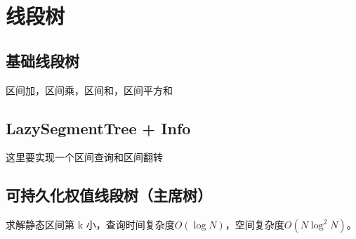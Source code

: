 \section{线段树}
\subsection{基础线段树}


区间加，区间乘，区间和，区间平方和


\subsection{LazySegmentTree + Info}
这里要实现一个区间查询和区间翻转


\subsection{可持久化权值线段树（主席树）}
求解静态区间第 k 小，查询时间复杂度$O(\log N)$，空间复杂度$O(N \log^2 N)$。

